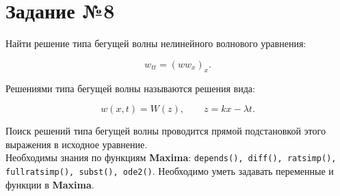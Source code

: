     \section*{Задание №8}

    Найти решение типа бегущей волны нелинейного волнового уравнения: 

    \[
        w_{tt} =  \left( w w_{x} \right)_{x}.
    \]

    Решениями типа бегущей волны называются решения вида:

    \[
        w(x, t) = W(z), \qquad z = k x - \lambda t.
    \]

    Поиск решений типа бегущей волны проводится прямой подстановкой этого выражения в исходное уравнение.\\

    Необходимы знания по функциям \textbf{Maxima}: {\tt depends(), diff(), ratsimp(), fullratsimp(), subst(), ode2()}. Необходимо уметь задавать переменные и функции в \textbf{Maxima}.
